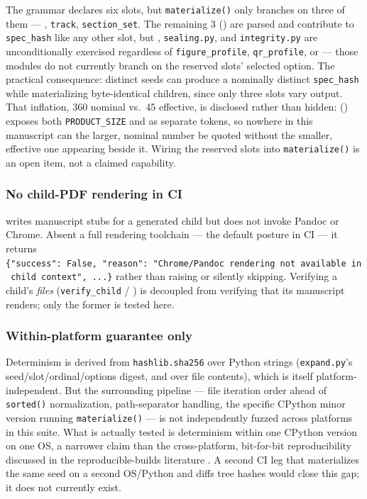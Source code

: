 \documentclass[
]{article}
\begin{document}
The grammar declares six slots, but \texttt{materialize()} only branches
on three of them --- , \texttt{track},
\texttt{section\_set}. The remaining 3
() are parsed
and contribute to \texttt{spec\_hash} like any other slot, but
, \texttt{sealing.py}, and
\texttt{integrity.py} are unconditionally exercised regardless of
\texttt{figure\_profile}, \texttt{qr\_profile}, or
 --- those modules do not currently branch on
the reserved slots' selected option. The practical consequence: distinct
seeds can produce a nominally distinct \texttt{spec\_hash} while
materializing byte-identical children, since only three slots vary
output. That inflation, 360 nominal vs.~45 effective, is disclosed
rather than hidden: 
() exposes both
\texttt{PRODUCT\_SIZE} and  as separate
tokens, so nowhere in this manuscript can the larger, nominal number be
quoted without the smaller, effective one appearing beside it. Wiring
the reserved slots into \texttt{materialize()} is an open item, not a
claimed capability.

\subsubsection{No child-PDF rendering in
CI}\label{no-child-pdf-rendering-in-ci}

 writes manuscript stubs
for a generated child but does not invoke Pandoc or Chrome. Absent a
full rendering toolchain --- the default posture in CI --- it returns
\texttt{\{"success":\ False,\ "reason":\ "Chrome/Pandoc\ rendering\ not\ available\ in\ child\ context",\ ...\}}
rather than raising or silently skipping. Verifying a child's
\emph{files} (\texttt{verify\_child} / ) is
decoupled from verifying that its manuscript renders; only the former is
tested here.

\subsubsection{Within-platform guarantee
only}\label{within-platform-guarantee-only}

Determinism is derived from \texttt{hashlib.sha256} over Python strings
(\texttt{expand.py}'s seed/slot/ordinal/options digest, and
 over file
contents), which is itself platform-independent. But the surrounding
pipeline --- file iteration order ahead of \texttt{sorted()}
normalization, path-separator handling, the specific CPython minor
version running \texttt{materialize()} --- is not independently fuzzed
across platforms in this suite. What is actually tested is determinism
within one CPython version on one OS, a narrower claim than the
cross-platform, bit-for-bit reproducibility discussed in the
reproducible-builds literature \citep{reproducible_builds}. A second CI
leg that materializes the same seed on a second OS/Python and diffs tree
hashes would close this gap; it does not currently exist.
\end{document}
